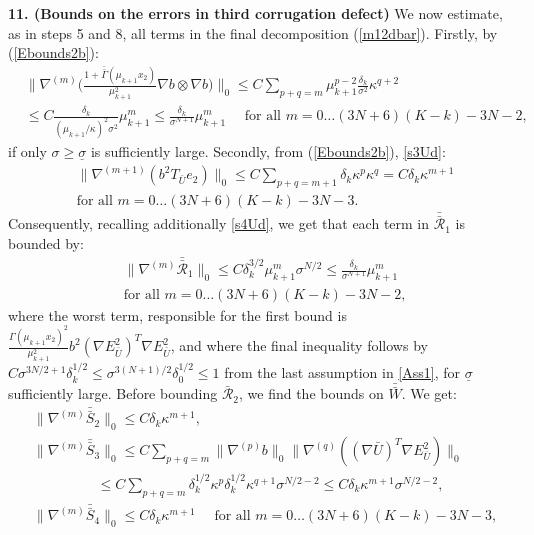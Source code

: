 \documentclass[reqno,twoside,11pt]{amsart}
\newcommand*{\dbar}[1]{\bar{\bar{#1}}}
\numberwithin{equation}{section}
\theoremstyle{plain}
\theoremstyle{definition}
\begin{document}
{\bf 11. (Bounds on the errors in third corrugation defect)}
We now estimate, as in steps 5 and 8, all terms in the final
decomposition (\ref{m12dbar}). Firstly, by (\ref{Ebounds2b}):
\begin{equation}\label{newterm}
\begin{split}
& \big\|\nabla^{(m)}\Big(\frac{1+\dbar\Gamma(\mu_{k+1}x_2)}{\mu_{k+1}^2}\nabla
b\otimes\nabla b\Big)\big\|_0
\leq C\sum_{p+q=m}\mu_{k+1}^{p-2}\frac{\delta_k}{\sigma^2}\kappa^{q+2}
\\ & \leq C\frac{\delta_k}{(\mu_{k+1}/\kappa)^2\sigma^2}\mu_{k+1}^m \leq 
\frac{\delta_k}{\sigma^{N+1}}\mu_{k+1}^m \quad \mbox{ for all } m=0\ldots (3N+6)(K-k)-3N-2,
\end{split}
\end{equation}
if only $\sigma\geq\underline\sigma$ is sufficiently large. 
Secondly, from (\ref{Ebounds2b}), \ref{s3Ud}:
\begin{equation}\label{s5dbar}
\begin{split}
& \|\nabla^{(m+1)}(b^2T_{\bar U}e_2)\|_0\leq 
C\sum_{p+q=m+1}\delta_k\kappa^p\kappa^q=C\delta_k\kappa^{m+1} 
\\ & \mbox{for all } m=0\ldots (3N+6)(K-k)-3N-3.
\end{split}
\end{equation}
Consequently, recalling additionally
\ref{s4Ud}, we get that each term in $\dbar{\mathcal{R}}_1$ is bounded by:
\begin{equation}\label{m13dbar}
\begin{split}
& \|\nabla^{(m)}\dbar{\mathcal{R}}_1\|_0\leq C\delta_k^{3/2}\mu_{k+1}^m\sigma^{N/2}\leq
\frac{\delta_k}{\sigma^{N+1}}\mu_{k+1}^m\\ & \mbox{for all } m=0\ldots (3N+6)(K-k)-3N-2,
\end{split}
\end{equation}
where the worst term, responsible for the first bound is
$\frac{\Gamma(\mu_{k+1}x_2)^2}{\mu_{k+1}^2}b^2(\nabla E^2_{\bar U})^T \nabla
E^2_{\bar U}$, and where the final inequality follows by
$C\sigma^{3N/2+1}\delta_k^{1/2}\leq \sigma^{3(N+1)/2}\delta_0^{1/2} \leq 1$ 
from the last assumption in \ref{Ass1}, for $\underline\sigma$ sufficiently large.
Before bounding $\bar{\mathcal{R}}_2$, we find the bounds on
$\dbar W$. We get:
\begin{equation}\label{SUbounddbar}
\begin{split}
& \|\nabla^{(m)}\dbar S_2\|_0\leq C\delta_k\kappa^{m+1},\\
& \|\nabla^{(m)}\dbar S_3\|_0\leq
C\sum_{p+q=m}\|\nabla^{(p)}b\|_0\|\nabla^{(q)}((\nabla \bar U)^T\nabla
E_{\bar U}^2)\|_0\\ & \qquad \qquad\;\; \leq
C\sum_{p+q=m}\delta_k^{1/2}\kappa^p \delta_k^{1/2}\kappa^{q+1}\sigma^{N/2-2}
\leq C\delta_k\kappa^{m+1}\sigma^{N/2-2}, \\
& \|\nabla^{(m)}\dbar S_4\|_0\leq C\delta_k\kappa^{m+1} \quad\mbox{ for all } 
m=0\ldots (3N+6)(K-k)-3N-3,
\end{split}
\end{equation}
\end{document}
